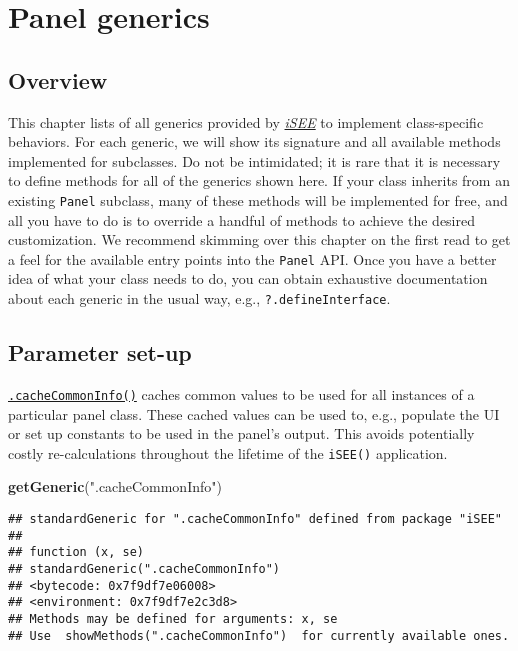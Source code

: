 \documentclass[
]{book}
\newenvironment{Shaded}{\begin{snugshade}}{\end{snugshade}}
\newcommand{\KeywordTok}[1]{\textcolor[rgb]{0.13,0.29,0.53}{\textbf{#1}}}
\newcommand{\NormalTok}[1]{#1}
\newcommand{\StringTok}[1]{\textcolor[rgb]{0.31,0.60,0.02}{#1}}
\begin{document}
\hypertarget{api}{%
\chapter{Panel generics}\label{api}}

\hypertarget{overview}{%
\section{Overview}\label{overview}}

This chapter lists of all generics provided by \emph{\href{https://bioconductor.org/packages/3.11/iSEE}{iSEE}} to implement class-specific behaviors.
For each generic, we will show its signature and all available methods implemented for subclasses.
Do not be intimidated; it is rare that it is necessary to define methods for all of the generics shown here.
If your class inherits from an existing \texttt{Panel} subclass, many of these methods will be implemented for free, and all you have to do is to override a handful of methods to achieve the desired customization.
We recommend skimming over this chapter on the first read to get a feel for the available entry points into the \texttt{Panel} API.
Once you have a better idea of what your class needs to do, you can obtain exhaustive documentation about each generic in the usual way, e.g., \texttt{?.defineInterface}.

\hypertarget{parameter-set-up}{%
\section{Parameter set-up}\label{parameter-set-up}}

\href{https://isee.github.io/iSEE/reference/setup-generics.html}{\texttt{.cacheCommonInfo()}} caches common values to be used for all instances of a particular panel class.
These cached values can be used to, e.g., populate the UI or set up constants to be used in the panel's output.
This avoids potentially costly re-calculations throughout the lifetime of the \texttt{iSEE()} application.

\begin{Shaded}
\begin{Highlighting}[]
\KeywordTok{getGeneric}\NormalTok{(}\StringTok{".cacheCommonInfo"}\NormalTok{)}
\end{Highlighting}
\end{Shaded}

\begin{verbatim}
## standardGeneric for ".cacheCommonInfo" defined from package "iSEE"
## 
## function (x, se) 
## standardGeneric(".cacheCommonInfo")
## <bytecode: 0x7f9df7e06008>
## <environment: 0x7f9df7e2c3d8>
## Methods may be defined for arguments: x, se
## Use  showMethods(".cacheCommonInfo")  for currently available ones.
\end{verbatim}
\end{document}
